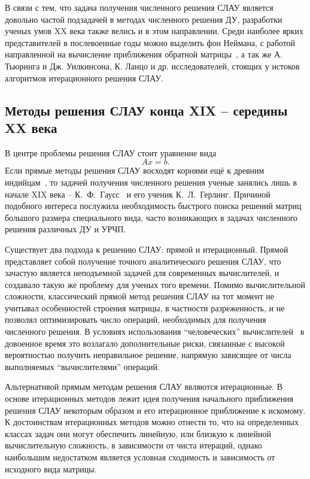 В связи с тем, что задача получения численного решения СЛАУ является довольно частой подзадачей в методах численного решения ДУ, разработки ученых умов XX века также велись и в этом направлении. Среди наиболее ярких представителей в послевоенные годы можно выделить фон Неймана, с работой направленной на вычисление приближения обратной матрицы~\cite{von_matrix}, а так же А. Тьюринга и Дж. Уилкинсона, К. Ланцо и др. исследователей, стоящих у истоков алгоритмов итерационного решения СЛАУ.


\subsection{Методы решения СЛАУ конца XIX -- середины XX века}
В центре проблемы решения СЛАУ стоит уравнение вида \[Ax = b.\] Если прямые методы решения СЛАУ восходят корнями ещё к древним индийцам~\cite{benzi}, то задачей получения численного решения ученые занялись лишь в начале XIX века -- К.~Ф.~Гаусс~\cite{w:gauss} и его ученик К.~Л.~Герлинг. Причиной подобного интереса послужила необходимость быстрого поиска решений матриц большого размера специального вида, часто возникающих в задачах численного решения различных ДУ и УРЧП.


Существует два подхода к решению СЛАУ: прямой и итерационный. Прямой представляет собой получение точного аналитического решения СЛАУ, что зачастую является неподъемной задачей для современных вычислителей, и создавало такую же проблему для ученых того времени. Помимо вычислительной сложности, классический прямой метод решения СЛАУ на тот момент не учитывал особенностей строения матрицы, в частности разреженность, и не позволял оптимизировать число операций, необходимых для получения численного решения. В условиях использования ``человеческих'' вычислителей~\cite{benzi} в довоенное время это возлагало дополнительные риски, связанные с высокой вероятностью получить неправильное решение, напрямую зависящее от числа выполняемых ``вычислителями'' операций.


Альтернативой прямым методам решения СЛАУ являются итерационные. В основе итерационных методов лежит идея получения начального приближения решения СЛАУ некоторым образом и его итерационное приближение к искомому. К достоинствам итерационных методов можно отнести то, что на определенных классах задач они могут обеспечить линейную, или близкую к линейной вычислительную сложность, в зависимости от чиста итераций, однако наибольшим недостатком является условная сходимость и зависимость от исходного вида матрицы. 


